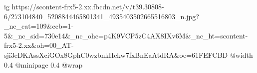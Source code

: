  
 
 
 
 

\ifcmt
  ig https://scontent-frx5-2.xx.fbcdn.net/v/t39.30808-6/273104840_5208844465801341_4935403502665516803_n.jpg?_nc_cat=109&ccb=1-5&_nc_sid=730e14&_nc_ohc=p4K9VCP5zC4AX8IXv6M&_nc_ht=scontent-frx5-2.xx&oh=00_AT-sji3eDKAssXciGOx8GphC0wzbnkHckw7fxBnEaAtdRA&oe=61FEFCBD
  @width 0.4
  @minipage 0.4
  @wrap \parpic[r]
\fi
